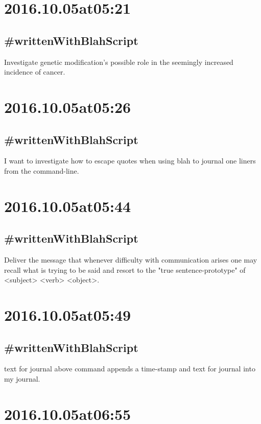 \begin{enumerate}
\begin{enumerate}
\section*{ 2016.10.05at05:21 }
\subsection*{ #writtenWithBlahScript }
Investigate genetic modification's possible role in the seemingly increased incidence of cancer.

\section*{ 2016.10.05at05:26 }
\subsection*{ #writtenWithBlahScript }
I want to investigate how to escape quotes when using blah to journal one liners from the command-line.

\section*{ 2016.10.05at05:44 }
\subsection*{ #writtenWithBlahScript }
Deliver the message that whenever difficulty with communication arises one may recall what is trying to be said and resort to the "true sentence-prototype" of <subject> <verb> <object>.

\section*{ 2016.10.05at05:49 }
\subsection*{ #writtenWithBlahScript }
text for journal
\nThe above command appends a time-stamp and text for journal into my journal.

\section*{ 2016.10.05at06:55 }

\end{enumerate}
\end{enumerate}
